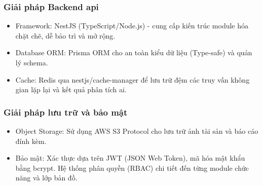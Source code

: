 \subsubsection{Giải pháp Backend \gls{api}}
\begin{itemize}
    \item Framework: NestJS (TypeScript/Node.js) - cung cấp kiến trúc module hóa chặt chẽ, dễ bảo trì và mở rộng.
    \item Database ORM: Prisma ORM cho an toàn kiểu dữ liệu (Type-safe) và quản lý schema.
    \item Cache: Redis qua nestjs/cache-manager để lưu trữ đệm các truy vấn không gian lặp lại và kết quả phân tích \gls{ai}.
\end{itemize}

\subsubsection{Giải pháp lưu trữ và bảo mật}
\begin{itemize}
    \item Object Storage: Sử dụng AWS S3 Protocol cho lưu trữ ảnh tài sản và báo cáo đính kèm.
    \item Bảo mật: Xác thực dựa trên JWT (JSON Web Token), mã hóa mật khẩu bằng bcrypt. Hệ thống phân quyền (RBAC) chi tiết đến từng module chức năng và lớp bản đồ.
\end{itemize}
\cleardoublepage